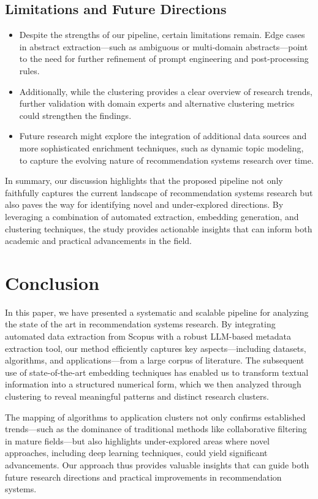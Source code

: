 \documentclass[
	a4paper, %
	10pt, %
	unnumberedsections, %
	twoside, %
]{LTJournalArticle}
\begin{document}
\subsection{Limitations and Future Directions}

\begin{itemize}
    \item Despite the strengths of our pipeline, certain limitations remain. Edge cases in abstract extraction—such as ambiguous or multi-domain abstracts—point to the need for further refinement of prompt engineering and post-processing rules.  
    \item Additionally, while the clustering provides a clear overview of research trends, further validation with domain experts and alternative clustering metrics could strengthen the findings.  
    \item Future research might explore the integration of additional data sources and more sophisticated enrichment techniques, such as dynamic topic modeling, to capture the evolving nature of recommendation systems research over time.
\end{itemize}

In summary, our discussion highlights that the proposed pipeline not only faithfully captures the current landscape of recommendation systems research but also paves the way for identifying novel and under-explored directions. By leveraging a combination of automated extraction, embedding generation, and clustering techniques, the study provides actionable insights that can inform both academic and practical advancements in the field.


\section{Conclusion}

In this paper, we have presented a systematic and scalable pipeline for analyzing the state of the art in recommendation systems research. By integrating automated data extraction from Scopus with a robust LLM-based metadata extraction tool, our method efficiently captures key aspects—including datasets, algorithms, and applications—from a large corpus of literature. The subsequent use of state-of-the-art embedding techniques has enabled us to transform textual information into a structured numerical form, which we then analyzed through clustering to reveal meaningful patterns and distinct research clusters.

The mapping of algorithms to application clusters not only confirms established trends—such as the dominance of traditional methods like collaborative filtering in mature fields—but also highlights under-explored areas where novel approaches, including deep learning techniques, could yield significant advancements. Our approach thus provides valuable insights that can guide both future research directions and practical improvements in recommendation systems.
\end{document}
